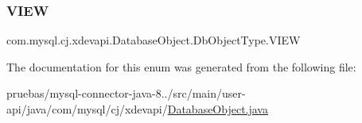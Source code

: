 \subsubsection{\texorpdfstring{V\+I\+EW}{VIEW}}
{\footnotesize\ttfamily com.\+mysql.\+cj.\+xdevapi.\+Database\+Object.\+Db\+Object\+Type.\+V\+I\+EW}



The documentation for this enum was generated from the following file\+:\begin{DoxyCompactItemize}
\item 
pruebas/mysql-\/connector-\/java-\/8../src/main/user-\/api/java/com/mysql/cj/xdevapi/\mbox{\hyperlink{_database_object_8java}{Database\+Object.\+java}}\end{DoxyCompactItemize}
